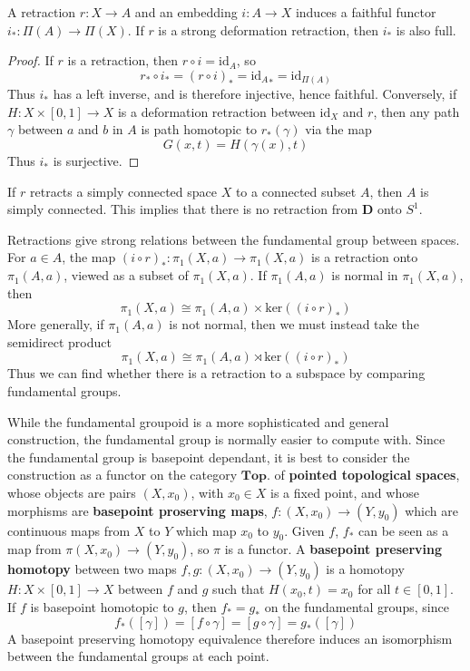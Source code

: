 \begin{theorem}
    A retraction $r: X \to A$ and an embedding $i: A \to X$ induces a faithful functor $i_*: \Pi(A) \to \Pi(X)$. If $r$ is a strong deformation retraction, then $i_*$ is also full.
\end{theorem}
\begin{proof}
    If $r$ is a retraction, then $r \circ i = \text{id}_A$, so
    \[ r_* \circ i_* = (r \circ i)_* = {\text{id}_A}_* = \text{id}_{\Pi(A)} \]
    Thus $i_*$ has a left inverse, and is therefore injective, hence faithful. Conversely, if $H: X \times [0,1] \to X$ is a deformation retraction between $\text{id}_X$ and $r$, then any path $\gamma$ between $a$ and $b$ in $A$ is path homotopic to $r_*(\gamma)$ via the map
    \[ G(x,t) = H(\gamma(x),t) \]
    Thus $i_*$ is surjective.
\end{proof}

\begin{example}
    If $r$ retracts a simply connected space $X$ to a connected subset $A$, then $A$ is simply connected. This implies that there is no retraction from $\mathbf{D}$ onto $S^1$.
\end{example}

Retractions give strong relations between the fundamental group between spaces. For $a \in A$, the map $(i \circ r)_*: \pi_1(X,a) \to \pi_1(X,a)$ is a retraction onto $\pi_1(A,a)$, viewed as a subset of $\pi_1(X,a)$. If $\pi_1(A,a)$ is normal in $\pi_1(X,a)$, then
%
\[ \pi_1(X,a) \cong \pi_1(A,a) \times \text{ker}((i \circ r)_*) \]
%
More generally, if $\pi_1(A,a)$ is not normal, then we must instead take the semidirect product
%
\[ \pi_1(X,a) \cong \pi_1(A,a) \rtimes \text{ker}((i \circ r)_*) \]
%
Thus we can find whether there is a retraction to a subspace by comparing fundamental groups.

While the fundamental groupoid is a more sophisticated and general construction, the fundamental group is normally easier to compute with. Since the fundamental group is basepoint dependant, it is best to consider the construction as a functor on the category $\textbf{Top.}$ of {\bf pointed topological spaces}, whose objects are pairs $(X,x_0)$, with $x_0 \in X$ is a fixed point, and whose morphisms are {\bf basepoint proserving maps}, $f: (X,x_0) \to (Y,y_0)$ which are continuous maps from $X$ to $Y$ which map $x_0$ to $y_0$. Given $f$, $f_*$ can be seen as a map from $\pi(X,x_0) \to (Y,y_0)$, so $\pi$ is a functor. A {\bf basepoint preserving homotopy} between two maps $f,g: (X,x_0) \to (Y,y_0)$ is a homotopy $H: X \times [0,1] \to X$ between $f$ and $g$ such that $H(x_0, t) = x_0$ for all $t \in [0,1]$. If $f$ is basepoint homotopic to $g$, then $f_* = g_*$ on the fundamental groups, since
%
\[ f_*([\gamma]) = [f \circ \gamma] = [g \circ \gamma] = g_*([\gamma]) \]
%
A basepoint preserving homotopy equivalence therefore induces an isomorphism between the fundamental groups at each point.

